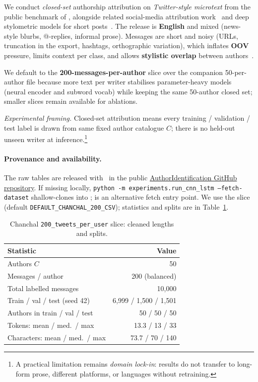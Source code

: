 \documentclass[11pt]{article}
\begin{document}
We conduct \emph{closed-set} authorship attribution on \emph{Twitter-style microtext} from the public benchmark of \citet{suman2021authorship}, alongside related social-media attribution work~\citep{theophilo2021authorship} and deep stylometric models for short posts~\citep{modupe2022post}.
The release is \textbf{English} and mixed (news-style blurbs, @-replies, informal prose).
Messages are short and noisy (URLs, truncation in the export, hashtags, orthographic variation), which inflates \textbf{OOV} pressure, limits context per class, and allows \textbf{stylistic overlap} between authors~\citep{suman2021authorship}.

We default to the \textbf{200-messages-per-author} slice over the companion 50-per-author file because more text per writer stabilises parameter-heavy models (neural encoder and subword vocab) while keeping the same 50-author closed set; smaller slices remain available for ablations.

\emph{Experimental framing.} Closed-set attribution means every training / validation / test label is drawn from same fixed author catalogue \(C\); there is no held-out unseen writer at inference.\footnote{A practical limitation remains \emph{domain lock-in}: results do not transfer to long-form prose, different platforms, or languages without retraining.}

\paragraph{Provenance and availability.}
The raw tables are released with~\citet{suman2021authorship} in the public \href{https://github.com/chanchalIITP/AuthorIdentification}{AuthorIdentification GitHub repository}.
If missing locally, \texttt{python -m experiments.run\_cnn\_lstm --fetch-dataset} shallow-clones into ;  is an alternative fetch entry point.
We use the  slice (default \texttt{DEFAULT\_CHANCHAL\_200\_CSV}); statistics and splits are in Table~\ref{tab:dataset-stats}.

\begin{table}[H]
  \centering
  \small
  \setlength{\tabcolsep}{3pt}
  \begin{tabular}{@{}p{}r@{}}
    \hline
    \textbf{Statistic} & \textbf{Value} \\
    \hline
    Authors \(C\) & 50 \\
    Messages / author & 200 (balanced) \\
    Total labelled messages & 10{,}000 \\
    Train / val / test (seed 42) & 6{,}999 / 1{,}500 / 1{,}501 \\
    Authors in train / val / test & 50 / 50 / 50 \\
    Tokens: mean / med.\ / max & 13.3 / 13 / 33 \\
    Characters: mean / med.\ / max & 73.7 / 70 / 140 \\
    \hline
  \end{tabular}
  \caption{Chanchal \texttt{200\_tweets\_per\_user} slice: cleaned lengths and splits.}
  \label{tab:dataset-stats}
\end{table}
\end{document}

